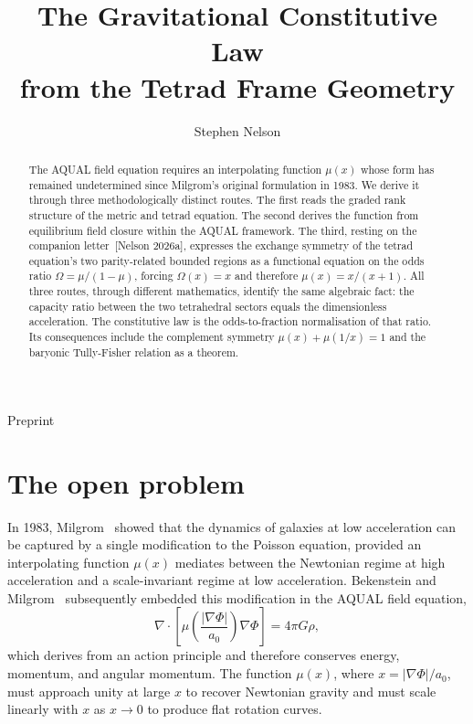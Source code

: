 \documentclass[twocolumn]{iopjournal}
\renewcommand{\articletype}[1]{%
  {\vspace*{-8mm}\noindent \Large \sf Preprint}\par
  \vspace*{6mm}\noindent{\scriptsize \sf{\bfseries \MakeUppercase{#1}}}}
\begin{document}
\articletype{Letter}

\title{The Gravitational Constitutive Law\\
from the Tetrad Frame Geometry}

\author{Stephen Nelson}



\begin{abstract}
The AQUAL field equation requires an interpolating function
$\mu(x)$ whose form has remained undetermined since Milgrom's
original formulation in 1983. We derive it through three
methodologically distinct routes. The first reads the graded
rank structure of the metric and tetrad equation. The second
derives the function from equilibrium field closure within the
AQUAL framework. The third, resting on the companion
letter~[Nelson 2026a], expresses the exchange symmetry of the
tetrad equation's two parity-related bounded regions as a
functional equation on the odds ratio
$\Omega = \mu/(1-\mu)$, forcing $\Omega(x) = x$ and therefore
$\mu(x) = x/(x+1)$. All three routes, through different
mathematics, identify the same algebraic fact: the capacity
ratio between the two tetrahedral sectors equals the
dimensionless acceleration. The constitutive law is the
odds-to-fraction normalisation of that ratio. Its consequences
include the complement symmetry $\mu(x) + \mu(1/x) = 1$ and
the baryonic Tully-Fisher relation as a theorem.
\end{abstract}


\section{The open problem}

In 1983, Milgrom~\cite{Milgrom1983} showed that the dynamics of
galaxies at low acceleration can be captured by a single
modification to the Poisson equation, provided an interpolating
function $\mu(x)$ mediates between the Newtonian regime at high
acceleration and a scale-invariant regime at low acceleration.
Bekenstein and Milgrom~\cite{BekensteinMilgrom1984} subsequently
embedded this modification in the AQUAL field equation,
\begin{equation}
  \nabla \cdot \!\left[\mu\!\left(\frac{|\nabla\Phi|}{a_0}\right)
  \nabla\Phi\right] = 4\pi G\rho,
  \label{eq:aqual}
\end{equation}
which derives from an action principle and therefore conserves
energy, momentum, and angular momentum. The function $\mu(x)$,
where $x = |\nabla\Phi|/a_0$, must approach unity at large $x$
to recover Newtonian gravity and must scale linearly with $x$
as $x \to 0$ to produce flat rotation curves.
\end{document}
